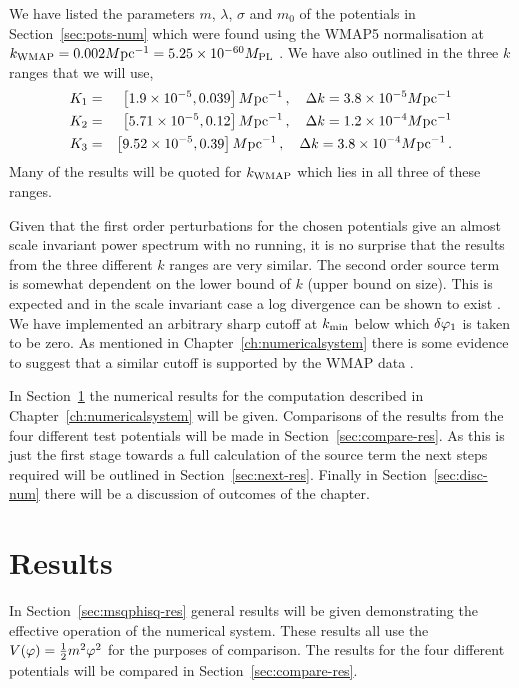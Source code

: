 We have listed the parameters $m$, $\lambda$, $\sigma$ and $m_0$ of the potentials
in Section~\ref{sec:pots-num} which were found using the WMAP5 normalisation at
$k_\mathrm{WMAP}=0.002 M \mathrm{pc}^{-1} = 5.25 \times 10^{-60}M_{\mathrm{PL}}$ \cite{Komatsu:2008hk}.
We have also outlined in  the three $k$ ranges that we will use,
% 
\begin{eqnarray*}
K_1 &=& \left[1.9\times 10^{-5}, 0.039\right]M \mathrm{pc}^{-1}\,,\quad \Delta k =
3.8\times 10^{-5}M \mathrm{pc}^{-1} \nonumber\\
K_2 &=& \left[5.71\times 10^{-5}, 0.12\right]M \mathrm{pc}^{-1}\,, \quad \Delta k =
1.2\times 10^{-4}M \mathrm{pc}^{-1}
\nonumber\\ 
K_3 &=& \left[9.52\times 10^{-5}, 0.39\right]M \mathrm{pc}^{-1}\,, \quad \Delta k =
3.8\times 10^{-4}M \mathrm{pc}^{-1} \,.
\end{eqnarray*}
Many of the results will be quoted for $k_\mathrm{WMAP}$ which lies in all three of these
ranges.

Given that the first order perturbations for the chosen potentials give an
almost scale invariant power spectrum with no running, it is no surprise that
the results from the three different $k$ ranges are very similar. The second
order source term is somewhat dependent on the lower bound of $k$ (upper bound
on size). This is expected and in the scale invariant case a log divergence can
be shown to exist \cite{Lyth:2007jh}. We have implemented an arbitrary sharp
cutoff at $k_{\mathrm{min}}$ below which 
$\delta\varphi_{1}$ is taken to be zero. 
As mentioned in Chapter~\ref{ch:numericalsystem} there is some evidence to suggest
that a similar cutoff is supported by the WMAP data \cite{Sinha:2005mn,Kim:2009pf}. 

In Section~\ref{sec:results} the numerical results for the computation described in
Chapter~\ref{ch:numericalsystem} will be given. Comparisons of the results from the
four different test potentials will be made in Section~\ref{sec:compare-res}. As
this is just the first stage towards a full calculation of the source term the next
steps required will be outlined in Section~\ref{sec:next-res}. Finally in
Section~\ref{sec:disc-num} there will be a discussion of outcomes of the chapter.
% 

\section{Results}
\label{sec:results}
In Section~\ref{sec:msqphisq-res} general results will be given demonstrating the
effective operation of the numerical system. These results all use the
$V(\varphi)=\frac{1}{2} m^2 \varphi^2$ for the purposes of comparison. The results for the four
different potentials will be compared in Section~\ref{sec:compare-res}.


